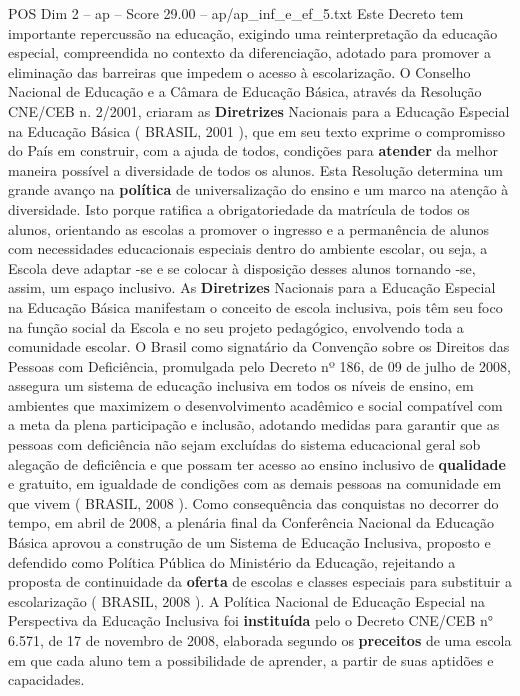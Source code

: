 \begin{textsample}{POS Dim 2 – ap – Score 29.00 – ap/ap\_inf\_e\_ef\_5.txt}
Este Decreto tem importante repercussão na educação, exigindo uma reinterpretação da educação especial, compreendida no contexto da diferenciação, adotado para promover a eliminação das barreiras que impedem o acesso à escolarização.
O Conselho Nacional de Educação e a Câmara de Educação Básica, através da Resolução CNE/CEB n. 2/2001, criaram as \textbf{Diretrizes} Nacionais para a Educação Especial na Educação Básica ( BRASIL, 2001 ), que em seu texto exprime o compromisso do País em construir, com a ajuda de todos, condições para \textbf{atender} da melhor maneira possível a diversidade de todos os alunos.
Esta Resolução determina um grande avanço na \textbf{política} de universalização do ensino e um marco na atenção à diversidade.
Isto porque ratifica a obrigatoriedade da matrícula de todos os alunos, orientando as escolas a promover o ingresso e a permanência de alunos com necessidades educacionais especiais dentro do ambiente escolar, ou seja, a Escola deve adaptar -se e se colocar à disposição desses alunos tornando -se, assim, um espaço inclusivo.
As \textbf{Diretrizes} Nacionais para a Educação Especial na Educação Básica manifestam o conceito de escola inclusiva, pois têm seu foco na função social da Escola e no seu projeto pedagógico, envolvendo toda a comunidade escolar.
O Brasil como signatário da Convenção sobre os Direitos das Pessoas com Deficiência, promulgada pelo Decreto nº 186, de 09 de julho de 2008, assegura um sistema de educação inclusiva em todos os níveis de ensino, em ambientes que maximizem o desenvolvimento acadêmico e social compatível com a meta da plena participação e inclusão, adotando medidas para garantir que as pessoas com deficiência não sejam excluídas do sistema educacional geral sob alegação de deficiência e que possam ter acesso ao ensino inclusivo de \textbf{qualidade} e gratuito, em igualdade de condições com as demais pessoas na comunidade em que vivem ( BRASIL, 2008 ).
Como consequência das conquistas no decorrer do tempo, em abril de 2008, a plenária final da Conferência Nacional da Educação Básica aprovou a construção de um Sistema de Educação Inclusiva, proposto e defendido como Política Pública do Ministério da Educação, rejeitando a proposta de continuidade da \textbf{oferta} de escolas e classes especiais para substituir a escolarização ( BRASIL, 2008 ).
A Política Nacional de Educação Especial na Perspectiva da Educação Inclusiva foi \textbf{instituída} pelo o Decreto CNE/CEB n{\EmojiFont °} 6.571, de 17 de novembro de 2008, elaborada segundo os \textbf{preceitos} de uma escola em que cada aluno tem a possibilidade de aprender, a partir de suas aptidões e capacidades.

\end{textsample}
